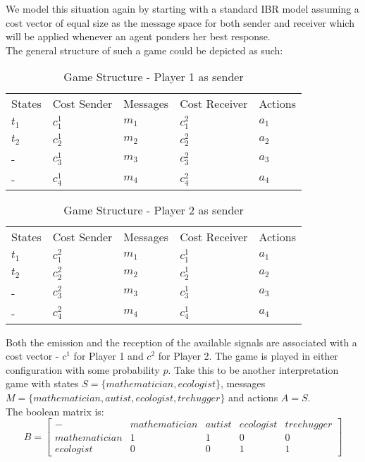 \documentclass[10]{article}
\begin{document}
We model this situation again by starting with a standard IBR model assuming a cost vector of equal size as the message space for both sender and receiver which will be applied whenever an agent ponders her best response. \\
The general structure of such a game could be depicted as such: %
\begin{table}[h]
\centering
\caption{Game Structure - Player 1 as sender}
\label{my-label}
\begin{tabular}{lllll}
States & Cost Sender & Messages & Cost Receiver & Actions \\
$t_1$  & $c^1_1$      & $m_1$    & $c^2_1$        & $a_1$   \\
$t_2$  & $c^1_2$      & $m_2$    & $c^2_2$        & $a_2$  \\
- & $c^1_3$ 		&$m_3$	& $c^2_3$		& $a_3$ \\
- & $c^1_4$ 		&$m_4$	& $c^2_4$		& $a_4$
\end{tabular}
\end{table}
\begin{table}[h]
\centering
\caption{Game Structure - Player 2 as sender}
\label{my-label}
\begin{tabular}{lllll}
States & Cost Sender & Messages & Cost Receiver & Actions \\
$t_1$  & $c^2_1$      & $m_1$    & $c^1_1$        & $a_1$   \\
$t_2$  & $c^2_2$      & $m_2$    & $c^1_2$        & $a_2$  \\
- & $c^2_3$ 		&$m_3$	& $c^1_3$		& $a_3$ \\
- & $c^2_4$ 		&$m_4$	& $c^1_4$		& $a_4$
\end{tabular}
\end{table}

Both the emission and the reception of the available signals are associated with a cost vector - $c^1$ for Player 1 and $c^2$ for Player 2. The game is played in either configuration with some probability $p$. Take this to be another interpretation game with states $S=\{mathematician, ecologist\}$, messages $M=\{mathematician,autist,ecologist,trehugger\}$ and actions $A=S$.\\
The boolean matrix is:
\begin{equation*}
B=
\begin{bmatrix}
- & mathematician & autist & ecologist & treehugger \\
mathematician  & 1      & 1    & 0        & 0   \\
ecologist  & 0     & 0   & 1       & 1 
\end{bmatrix}
\end{equation*}
\end{document}
